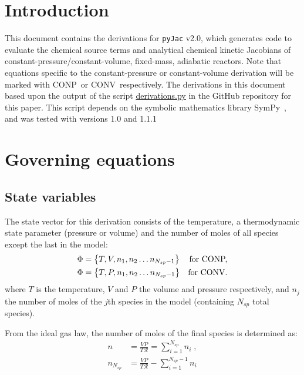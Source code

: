 \documentclass[12pt]{article}
\newcommand{\ns}{N_{sp}}
\newcommand{\conp}{CONP}
\newcommand{\conv}{CONV}
\newcommand{\dconp}{\ifmmode\text{for \conp,}\else for \conp,\fi}
\newcommand{\dconv}{\ifmmode\text{for \conv,}\else for \conv.\fi}
\newcommand{\Ru}{\mathcal{R}}
\begin{document}
\section{Introduction}
This document contains the derivations for \texttt{pyJac} v2.0, which generates code to evaluate the chemical source terms and analytical chemical kinetic Jacobians of constant-pressure\slash constant-volume, fixed-mass, adiabatic reactors.
Note that equations specific to the constant-pressure or constant-volume derivation will be marked with \conp~or \conv~respectively.
The derivations in this document based upon the output of the script \href{https://github.com/arghdos/SPyJac-paper/blob/master/derivations/scripts/derivations.py}{derivations.py} in the GitHub repository for this paper.
This script depends on the symbolic mathematics library SymPy~\cite{sympy}, and was tested with versions 1.0 and 1.1.1

\section{Governing equations}
\subsection{State variables}
The state vector for this derivation consists of the temperature, a thermodynamic state parameter (pressure or volume) and the number of moles of all species except the last in the model:
\begin{subequations}
\begin{align}
\Phi &= \left\{T, V, n_1, n_2 \ldots n_{\ns - 1}\right\}&\text{\dconp}\\
\Phi &= \left\{T, P, n_1, n_2 \ldots n_{\ns - 1}\right\}&\text{\dconv}
\end{align}
\end{subequations}
where $T$ is the temperature, $V$ and $P$ the volume and pressure respectively, and $n_j$ the number of moles of the $j$th species in the model (containing $\ns$ total species).

From the ideal gas law, the number of moles of the final species is determined as:
\begin{align}
n &= \frac{V P}{T \Ru} = \sum_{i=1}^{\ns}{n_i}\; , \nonumber \\
n_{\ns} &= \frac{V P}{T \Ru} - \sum_{i=1}^{\ns - 1}{n_i}
\end{align}
\end{document}
